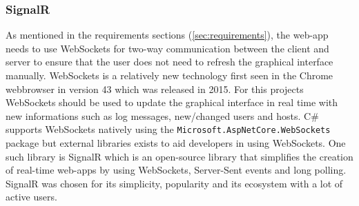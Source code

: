 \documentclass{article}
\begin{document}
\subsubsection{SignalR}
As mentioned in the requirements sections (\ref{sec:requirements}), the web-app needs to use WebSockets for two-way communication between the client and server to ensure that the user does not need to refresh the graphical interface manually. WebSockets is a relatively new technology first seen in the Chrome webbrowser in version 43 which was released in 2015\cite{url:implementation:websockets}. For this projects WebSockets should be used to update the graphical interface in real time with new informations such as log messages, new/changed users and hosts. C\# supports WebSockets natively using the \texttt{Microsoft.AspNetCore.WebSockets} package but external libraries exists to aid developers in using WebSockets. One such library is SignalR\cite{url:implementation:signalr} which is an open-source library that simplifies the creation of real-time web-apps by using WebSockets, Server-Sent events and long polling. SignalR was chosen for its simplicity, popularity and its ecosystem with a lot of active users.
\end{document}
